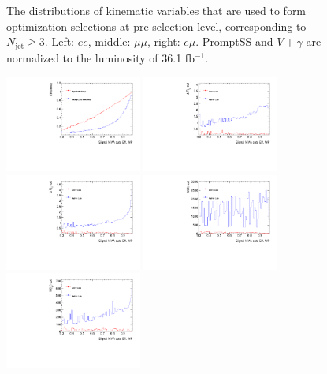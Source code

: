\begin{figure}[h]
\begin{minipage}[t]{0.33\linewidth}
 \end{minipage}
 \caption{The distributions of kinematic variables that are used to form optimization selections at pre-selection level, corresponding to $N_{\text{jet}}\geq3$. Left: $ee$, middle: $\mu\mu$, right: $e\mu$. PromptSS and $V+\gamma$ are normalized to the luminosity of 36.1 fb$^{-1}$.}
\label{fig:SigOpt_high_kine}
\end{figure}
\begin{figure}[h]
\begin{center}
\includegraphics[width = 0.4\textwidth]{fig/SigOpt/nonres/Efficiency_mumu.pdf}
\includegraphics[width = 0.4\textwidth]{fig/SigOpt/nonres/mindR_l2j_mumu.pdf}
\includegraphics[width = 0.4\textwidth]{fig/SigOpt/nonres/mindR_l1j_mumu.pdf}
\includegraphics[width = 0.4\textwidth]{fig/SigOpt/nonres/m_ll_mumu.pdf}
\includegraphics[width = 0.4\textwidth]{fig/SigOpt/nonres/m_l1jj_mumu.pdf}

\end{center}
\end{figure}
